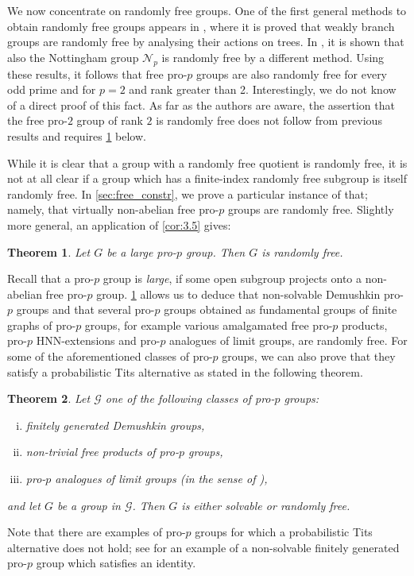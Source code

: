 \documentclass[a4paper,10pt]{amsart}
\theoremstyle{plain}
\newtheorem{thmABC}{Theorem}
\theoremstyle{definition}
\numberwithin{equation}{section}
\begin{document}
We now concentrate on randomly free groups. One of the first general methods to obtain randomly free groups appears in \cite{Ab05}, where it is proved that weakly branch groups are randomly free by analysing their actions on trees. In \cite{Sz05}, it is shown that also the Nottingham group $\mathcal{N}_p$ is randomly free by a different method. Using these results, it follows that free pro-$p$ groups are also randomly free for every odd prime and for $p=2$ and rank greater than 2. Interestingly, we do not know of a direct proof of this fact. As far as the authors are aware, the assertion that the free pro-$2$ group of rank $2$ is randomly free does not follow from previous results and requires \cref{vfpprobtits} below.

While it is clear that a group with a randomly free quotient is randomly free, it is not at all clear if a group which has a finite-index randomly free subgroup is itself randomly free. In \cref{sec:free_constr}, we prove a particular instance of that; namely, that virtually non-abelian free pro-$p$ groups are randomly free. Slightly more general, an application of  
 \cref{cor:3.5} gives:

\begin{thmABC}\label{vfpprobtits}
Let $G$ be a large pro-$p$ group. Then $G$ is randomly free.
\end{thmABC} 

Recall that a pro-$p$ group is \emph{large}, if some open subgroup projects onto a non-abelian free pro-$p$ group. \cref{vfpprobtits} allows us to deduce that non-solvable Demushkin pro-$p$ groups and that several pro-$p$ groups obtained as fundamental groups of finite graphs of pro-$p$ groups, for example various amalgamated free pro-$p$ products, pro-$p$ HNN-extensions and pro-$p$ analogues of limit groups, are randomly free. For some of the aforementioned classes of pro-$p$ groups, we can also prove that they satisfy a probabilistic Tits alternative as stated in the following theorem.

\begin{thmABC}\label{thm:list}
    Let $\mathcal{G}$ one of the following classes of pro-$p$ groups:
    \begin{enumerate}[(i)]
        \item finitely generated Demushkin groups,
        \item non-trivial free products of pro-$p$ groups,
        \item pro-$p$ analogues of limit groups (in the sense of \cite{KZ}),
    \end{enumerate}
    and let $G$ be a group in $\mathcal{G}$. Then $G$ is either solvable or randomly free.
\end{thmABC}
Note that there are examples of pro-$p$ groups for which a probabilistic Tits alternative does not hold; see \cite[Corollary 10]{CM07} for an example of a non-solvable finitely generated pro-$p$ group which satisfies an identity.
\end{document}
